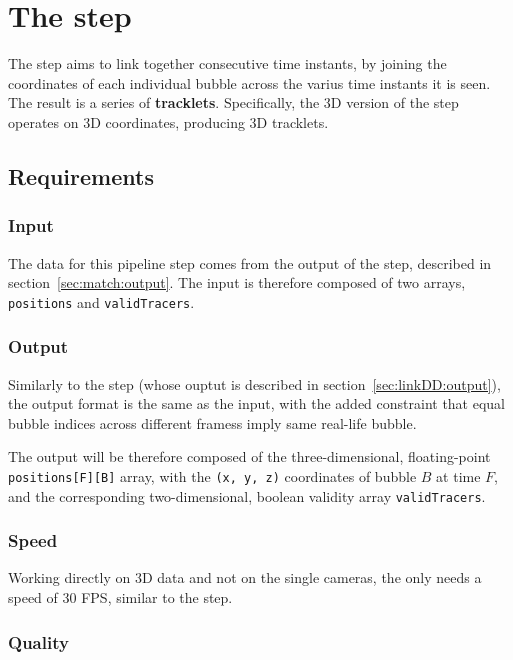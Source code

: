 \chapter{The \linkDDD* step}
\label{chap:3dlink}

The \link* step aims to link together consecutive time instants, by joining the coordinates of each individual bubble across the varius time instants it is seen.
The result is a series of \textbf{tracklets}.
Specifically, the 3D version of the \link* step operates on 3D coordinates, producing 3D tracklets.

\section{Requirements}

\subsection{Input}

The data for this pipeline step comes from the output of the \match* step, described in section~\ref{sec:match:output}.
The input is therefore composed of two arrays, \texttt{positions} and \texttt{validTracers}.

\subsection{Output}

Similarly to the \linkDD* step (whose ouptut is described in section~\ref{sec:linkDD:output}), the output format is the same as the input, with the added constraint that equal bubble indices across different framess imply same real-life bubble.

The output will be therefore composed of the three-dimensional, floating-point \texttt{positions[F][B]} array, with the \texttt{(x, y, z)} coordinates of bubble $B$ at time $F$, and the corresponding two-dimensional, boolean validity array \texttt{validTracers}.

\subsection{Speed}

Working directly on 3D data and not on the single cameras, the \linkDDD* only needs a speed of 30 FPS, similar to the \match* step.

\subsection{Quality}

